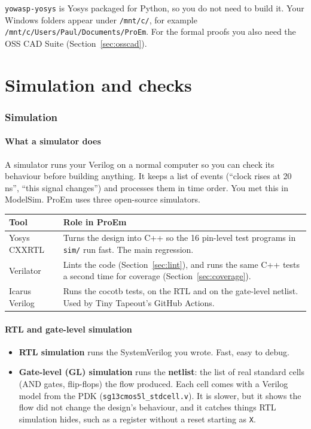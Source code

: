 \documentclass[11pt,a4paper]{article}
\newcommand{\file}[1]{\texttt{#1}}
\begin{document}
\texttt{yowasp-yosys} is Yosys packaged for Python, so you do not need to build it. Your Windows folders appear under \file{/mnt/c/}, for example \file{/mnt/c/Users/Paul/Documents/ProEm}. For the formal proofs you also need the OSS CAD Suite (Section~\ref{sec:osscad}).

\part{Simulation and checks}\label{part:sim}

\section{Simulation}

\subsection{What a simulator does}

A simulator runs your Verilog on a normal computer so you can check its behaviour before building anything. It keeps a list of events (``clock rises at 20\,ns'', ``this signal changes'') and processes them in time order. You met this in ModelSim. ProEm uses three open-source simulators.

\begin{center}
\begin{tabularx}{\linewidth}{@{}lL@{}}
\toprule
Tool & Role in ProEm \\
\midrule
Yosys CXXRTL & Turns the design into C++ so the 16 pin-level test programs in \file{sim/} run fast. The main regression. \\
Verilator & Lints the code (Section~\ref{sec:lint}), and runs the same C++ tests a second time for coverage (Section~\ref{sec:coverage}). \\
Icarus Verilog & Runs the cocotb tests, on the RTL and on the gate-level netlist. Used by Tiny Tapeout's GitHub Actions. \\
\bottomrule
\end{tabularx}
\end{center}

\subsection{RTL and gate-level simulation}

\begin{itemize}
\item \textbf{RTL simulation} runs the SystemVerilog you wrote. Fast, easy to debug.
\item \textbf{Gate-level (GL) simulation} runs the \textbf{netlist}: the list of real standard cells (AND gates, flip-flops) the flow produced. Each cell comes with a Verilog model from the PDK (\file{sg13cmos5l\_stdcell.v}). It is slower, but it shows the flow did not change the design's behaviour, and it catches things RTL simulation hides, such as a register without a reset starting as \texttt{X}.
\end{itemize}
\end{document}
